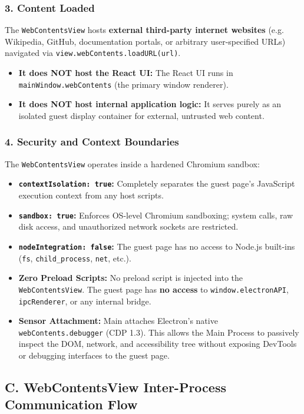 \documentclass[11pt,a4paper]{article}
\begin{document}
\subsubsection{3. Content Loaded}
The \texttt{WebContentsView} hosts \textbf{external third-party internet websites} (e.g. Wikipedia, GitHub, documentation portals, or arbitrary user-specified URLs) navigated via \texttt{view.webContents.loadURL(url)}.
\begin{itemize}[leftmargin=1.4em]
\item \textbf{It does NOT host the React UI:} The React UI runs in \texttt{mainWindow.webContents} (the primary window renderer).
\item \textbf{It does NOT host internal application logic:} It serves purely as an isolated guest display container for external, untrusted web content.
\end{itemize}

\subsubsection{4. Security and Context Boundaries}
The \texttt{WebContentsView} operates inside a hardened Chromium sandbox:
\begin{itemize}[leftmargin=1.4em]
\item \textbf{\texttt{contextIsolation: true}:} Completely separates the guest page's JavaScript execution context from any host scripts.
\item \textbf{\texttt{sandbox: true}:} Enforces OS-level Chromium sandboxing; system calls, raw disk access, and unauthorized network sockets are restricted.
\item \textbf{\texttt{nodeIntegration: false}:} The guest page has no access to Node.js built-ins (\texttt{fs}, \texttt{child\_process}, \texttt{net}, etc.).
\item \textbf{Zero Preload Scripts:} No preload script is injected into the \texttt{WebContentsView}. The guest page has \textbf{no access} to \texttt{window.electronAPI}, \texttt{ipcRenderer}, or any internal bridge.
\item \textbf{Sensor Attachment:} Main attaches Electron's native \texttt{webContents.debugger} (CDP 1.3). This allows the Main Process to passively inspect the DOM, network, and accessibility tree without exposing DevTools or debugging interfaces to the guest page.
\end{itemize}

\subsection{C. WebContentsView Inter-Process Communication Flow}
\end{document}
